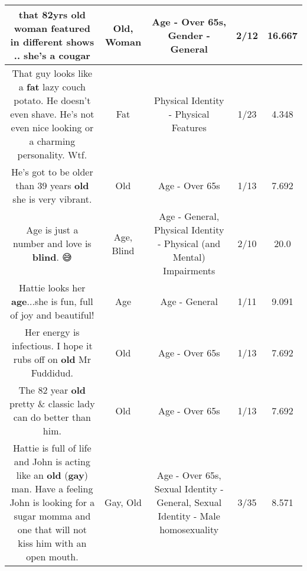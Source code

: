 \documentclass[11pt]{article}
\newlength\mylength
\begin{document}
\begin{center}
\begin{longtable}{|C{.65\mylength}|C{.30\mylength}|C{.12\mylength}|C{.12\mylength}|C{.12\mylength}|}
  \small that 82yrs \textbf{old} \textbf{woman} featured in different shows .. she's a cougar\normalsize   & Old, Woman & Age - Over 65s, Gender - General & 2/12 & 16.667 \\  \hline
  \small That guy looks like a \textbf{fat} lazy couch potato. He doesn't even shave. He's not even nice looking or a charming personality. Wtf.\normalsize   & Fat & Physical Identity - Physical Features & 1/23 & 4.348 \\  \hline
  \small He's got to be older than 39 years \textbf{old} she is very vibrant.\normalsize   & Old & Age - Over 65s & 1/13 & 7.692 \\  \hline
  \small Age is just a number and love is \textbf{blind}. 😅\normalsize   & Age, Blind & Age - General, Physical Identity - Physical (and Mental) Impairments & 2/10 & 20.0 \\  \hline
  \small Hattie looks her \textbf{age}...she is fun, full of joy and beautiful!\normalsize   & Age & Age - General & 1/11 & 9.091 \\  \hline
  \small Her energy is infectious.  I hope it rubs off on \textbf{old} Mr Fuddidud.\normalsize   & Old & Age - Over 65s & 1/13 & 7.692 \\  \hline
  \small The 82 year \textbf{old} pretty \& classic lady can do better than him.\normalsize   & Old & Age - Over 65s & 1/13 & 7.692 \\  \hline
  \small Hattie is full of life and John is acting like an \textbf{old} (\textbf{g\textbf{ay}}) man.   Have a feeling John is looking for a sugar momma and one that will not kiss him with an open mouth.\normalsize   & Gay, Old & Age - Over 65s, Sexual Identity - General, Sexual Identity - Male homosexuality & 3/35 & 8.571 \\  \hline

\end{longtable}
\end{center}
\end{document}
